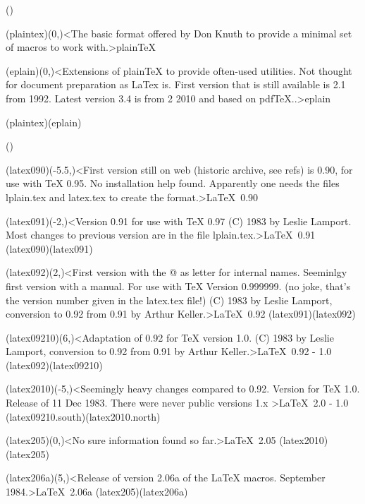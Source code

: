 \clearpage

\tograph(){
	\tonode(plaintex)(0,\layer)<The basic format offered by Don Knuth to provide a minimal set of macros to work with.>{plain\TeX}

\steplayer[-2]

	\tonode(eplain)(0,\layer)<Extensions of plainTeX to provide often-used utilities. Not thought for document preparation as LaTex is. First version that is still available is 2.1 from 1992. Latest version 3.4 is from 2 2010 and based on pdfTeX..>{eplain}

\todraw(plaintex)(eplain)
}
\clearpage

\tograph*(){

	\tonode(latex090)(-5.5,\layer)<First version still on web (historic archive, see refs) is 0.90, for use with TeX 0.95. No installation help found. Apparently one needs the files lplain.tex and latex.tex to create the format.>{\LaTeX\ 0.90}
	
	\tonode(latex091)(-2,\layer)<Version 0.91 for use with TeX 0.97 (C) 1983 by Leslie Lamport. Most changes to previous version are in the file lplain.tex.>{\LaTeX\ 0.91}
	\todraw(latex090)(latex091)
	
	\tonode(latex092)(2,\layer)<First version with the @ as letter for internal names. Seeminlgy first version with a manual. For use with TeX Version 0.999999. (no joke, that's the version number given in the latex.tex file!) (C) 1983 by Leslie Lamport, conversion to 0.92 from 0.91 by Arthur Keller.>{\LaTeX\ 0.92}
	\todraw(latex091)(latex092)

	\tonode(latex09210)(6,\layer)<Adaptation of 0.92 for TeX version 1.0. (C) 1983 by Leslie Lamport, conversion to 0.92 from 0.91 by Arthur Keller.>{\LaTeX\ 0.92 - 1.0}
	\todraw(latex092)(latex09210)
	\steplayer[-2.3]

	\tonode(latex2010)(-5,\layer)<Seemingly heavy changes compared to 0.92. Version for TeX 1.0. Release of 11 Dec 1983. There were never public versions 1.x >{\LaTeX\ 2.0 - 1.0}
	\todraw(latex09210.south)(latex2010.north)
	
	\tonode(latex205)(0,\layer)<No sure information found so far.>{\LaTeX\ 2.05}
	\todraw(latex2010)(latex205)
	
	\tonode(latex206a)(5,\layer)<Release of version 2.06a of the LaTeX macros. September 1984.>{\LaTeX\ 2.06a}
	\todraw(latex205)(latex206a)
	
}
